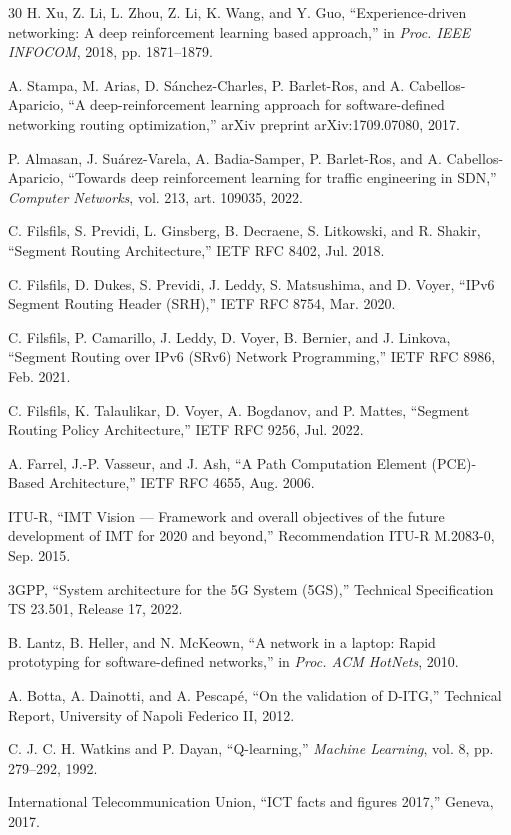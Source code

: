 \documentclass[journal]{IEEEtran}
\begin{document}
\begin{thebibliography}{30}
 H. Xu, Z. Li, L. Zhou, Z. Li, K. Wang, and Y.
Guo, ``Experience-driven networking: A deep reinforcement learning based
approach,'' in \emph{Proc. IEEE INFOCOM}, 2018, pp. 1871--1879.

 A. Stampa, M. Arias, D. S\'anchez-Charles, P.
Barlet-Ros, and A. Cabellos-Aparicio, ``A deep-reinforcement learning
approach for software-defined networking routing optimization,'' arXiv
preprint arXiv:1709.07080, 2017.

 P. Almasan, J. Su\'arez-Varela, A. Badia-Samper, P.
Barlet-Ros, and A. Cabellos-Aparicio, ``Towards deep reinforcement learning
for traffic engineering in SDN,'' \emph{Computer Networks}, vol. 213, art.
109035, 2022.

 C. Filsfils, S. Previdi, L. Ginsberg, B. Decraene, S.
Litkowski, and R. Shakir, ``Segment Routing Architecture,'' IETF RFC 8402,
Jul. 2018.

 C. Filsfils, D. Dukes, S. Previdi, J. Leddy, S.
Matsushima, and D. Voyer, ``IPv6 Segment Routing Header (SRH),'' IETF RFC
8754, Mar. 2020.

 C. Filsfils, P. Camarillo, J. Leddy, D. Voyer, B.
Bernier, and J. Linkova, ``Segment Routing over IPv6 (SRv6) Network
Programming,'' IETF RFC 8986, Feb. 2021.

 C. Filsfils, K. Talaulikar, D. Voyer, A. Bogdanov, and P.
Mattes, ``Segment Routing Policy Architecture,'' IETF RFC 9256, Jul. 2022.

 A. Farrel, J.-P. Vasseur, and J. Ash, ``A Path Computation
Element (PCE)-Based Architecture,'' IETF RFC 4655, Aug. 2006.

 ITU-R, ``IMT Vision --- Framework and overall objectives
of the future development of IMT for 2020 and beyond,'' Recommendation
ITU-R M.2083-0, Sep. 2015.

 3GPP, ``System architecture for the 5G System
(5GS),'' Technical Specification TS 23.501, Release 17, 2022.

 B. Lantz, B. Heller, and N. McKeown, ``A network in a
laptop: Rapid prototyping for software-defined networks,'' in \emph{Proc.
ACM HotNets}, 2010.

 A. Botta, A. Dainotti, and A. Pescap\'e, ``On the
validation of D-ITG,'' Technical Report, University of Napoli Federico II,
2012.

 C. J. C. H. Watkins and P. Dayan, ``Q-learning,''
\emph{Machine Learning}, vol. 8, pp. 279--292, 1992.

 International Telecommunication Union, ``ICT facts and
figures 2017,'' Geneva, 2017.

\end{thebibliography}
\end{document}
